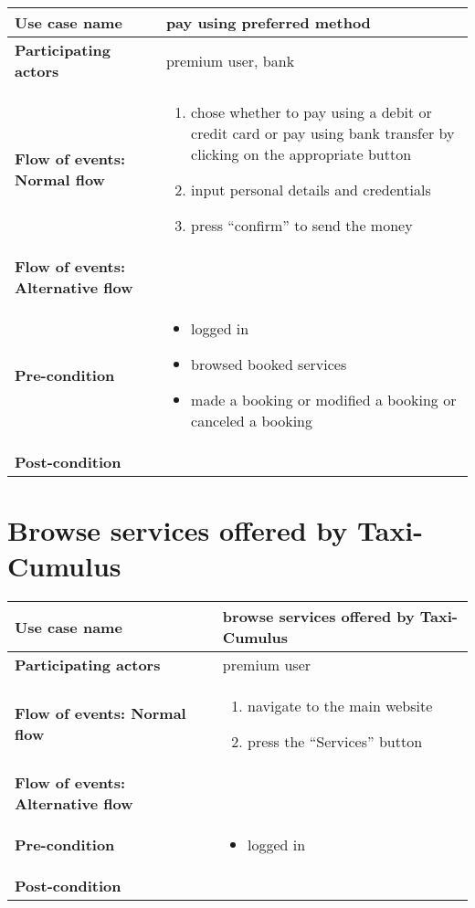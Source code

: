\documentclass[a4paper, 13pt, draft]{report}
\begin{document}
\begin{center}
	\begin{tabular}{| >{\bf}l | p{5.55cm} |} 
		\hline
		Use case name & pay using preferred method \\ 
		\hline
		Participating actors & premium user, bank \\
		\hline
		Flow of events: Normal flow & 
		\begin{enumerate}		
			\item chose whether to pay using a debit or credit card or pay using bank transfer by clicking on the appropriate button
			\item input personal details and credentials
			\item press ``confirm'' to send the money 
		\end{enumerate}	\\
		\hline
		Flow of events: Alternative flow & \notapplicable \\
		\hline
		Pre-condition & 
		\begin{itemize} 
			\item logged in
			\item browsed booked services
			\item made a booking or modified a booking or canceled a booking
		\end{itemize} \\
		\hline
		Post-condition & \notapplicable \\
		\hline
	\end{tabular}
\end{center}

\section*{Browse services offered by Taxi-Cumulus}

\begin{center}
	\begin{tabular}{| >{\bf}l | p{5.55cm} |} 
		\hline
		Use case name & browse services offered by Taxi-Cumulus \\ 
		\hline
		Participating actors & premium user \\
		\hline
		Flow of events: Normal flow & 
		\begin{enumerate}		
			\item navigate to the main website
			\item press the ``Services'' button
		\end{enumerate}	\\
		\hline
		Flow of events: Alternative flow & \notapplicable \\
		\hline
		Pre-condition & 
		\begin{itemize} 
			\item logged in
		\end{itemize} \\
		\hline
		Post-condition & \notapplicable \\
		\hline
	\end{tabular}
\end{center}
\end{document}
